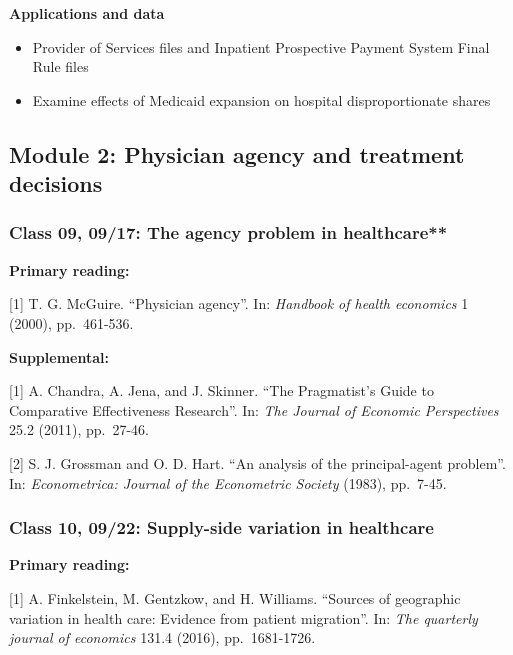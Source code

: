 \documentclass[11pt,]{article}
\providecommand{\tightlist}{%
  \setlength{\itemsep}{0pt}\setlength{\parskip}{0pt}}
\begin{document}
\textbf{Applications and data}

\begin{itemize}
\tightlist
\item
  Provider of Services files and Inpatient Prospective Payment System
  Final Rule files
\item
  Examine effects of Medicaid expansion on hospital disproportionate
  shares
\end{itemize}

\hypertarget{module-2-physician-agency-and-treatment-decisions}{%
\subsection{Module 2: Physician agency and treatment
decisions}\label{module-2-physician-agency-and-treatment-decisions}}

\hypertarget{class-09-0917-the-agency-problem-in-healthcare}{%
\subsubsection{Class 09, 09/17: The agency problem in
healthcare**}\label{class-09-0917-the-agency-problem-in-healthcare}}

\textbf{Primary reading:}

{[}1{]} T. G. McGuire. ``Physician agency''. In: \emph{Handbook of
health economics} 1 (2000), pp.~461-536.

\textbf{Supplemental:}

{[}1{]} A. Chandra, A. Jena, and J. Skinner. ``The Pragmatist's Guide to
Comparative Effectiveness Research''. In: \emph{The Journal of Economic
Perspectives} 25.2 (2011), pp.~27-46.

{[}2{]} S. J. Grossman and O. D. Hart. ``An analysis of the
principal-agent problem''. In: \emph{Econometrica: Journal of the
Econometric Society} (1983), pp.~7-45.

\hypertarget{class-10-0922-supply-side-variation-in-healthcare}{%
\subsubsection{Class 10, 09/22: Supply-side variation in
healthcare}\label{class-10-0922-supply-side-variation-in-healthcare}}

\textbf{Primary reading:}

{[}1{]} A. Finkelstein, M. Gentzkow, and H. Williams. ``Sources of
geographic variation in health care: Evidence from patient migration''.
In: \emph{The quarterly journal of economics} 131.4 (2016),
pp.~1681-1726.
\end{document}
